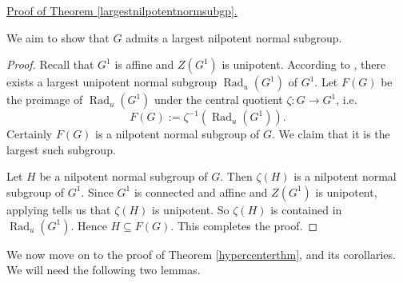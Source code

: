 \documentclass[twoside,a4paper,reqno,11pt]{amsart}
\DeclareMathOperator{\Rad}{Rad}
\theoremstyle{definition}
\begin{document}
\vspace{2mm}\noindent \underline{Proof of Theorem \ref{largestnilpotentnormsubgp}.}

\vspace{2mm}\noindent We aim to show that $G$ admits a largest nilpotent normal subgroup.

\begin{proof} Recall that $G^1$ is affine and $Z(G^1)$ is unipotent. According to \cite[Thm.\ 1.1]{S}, there exists a largest unipotent normal subgroup $\Rad_u(G^1)$ of $G^1$. Let $F(G)$ be the preimage of $\Rad_u(G^1)$ under the central quotient $\zeta:G\to G^1$, i.e. $$F(G):=\zeta^{-1}(\Rad_u(G^1)).$$ Certainly $F(G)$ is a nilpotent normal subgroup of $G$. We claim that it is the largest such subgroup.

\vspace{2mm}\noindent Let $H$ be a nilpotent normal subgroup of $G$. Then $\zeta(H)$ is a nilpotent normal subgroup of $G^1$. Since $G^1$ is connected and affine and $Z(G^1)$ is unipotent, applying \cite[IV, \S4, Cor.\ 1.13]{DG} tells us that $\zeta(H)$ is unipotent. So $\zeta(H)$ is contained in $\Rad_u(G^1)$. Hence $H\subseteq F(G)$. This completes the proof. %
\end{proof}

\noindent We now move on to the proof of Theorem \ref{hypercenterthm}, and its corollaries. We will need the following two lemmas. 
\end{document}
